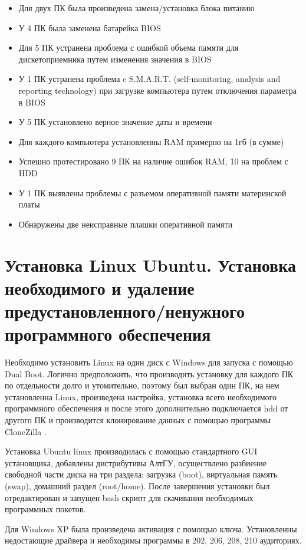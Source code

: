\documentclass[14pt, oneside]{altsu-report}
\begin{document}
\begin{itemize}
  \item Для двух ПК была произведена замена/установка блока питанию
  \item У 4 ПК была заменена батарейка BIOS
  \item Для 5 ПК устранена проблема с ошибкой объема памяти для дискетоприемника путем изменения значения в BIOS
  \item У 1 ПК устранена проблема c S.M.A.R.T. (self-monitoring, analysis and reporting technology) \cite{smart} при загрузке компьютера путем отключения параметра в BIOS
  \item У 5 ПК установлено верное значение даты и времени
  \item Для каждого компьютера установленны RAM примерно на 1гб (в сумме)
  \item Успешно протестировано 9 ПК на наличие ошибок RAM, 10 на проблем с HDD
  \item У 1 ПК выявлены проблемы с разъемом оперативной памяти материнской платы
  \item Обнаружены две неисправные плашки оперативной памяти
\end{itemize}

\section{Установка Linux Ubuntu. Установка необходимого и удаление предустановленного/ненужного программного обеспечения}
Необходимо установить Linux на один диск с Windows для запуска с помощью Dual Boot. Логично предположить, что производить установку для каждого ПК по отдельности долго и утомительно, поэтому был выбран один ПК, на нем установленна Linux, произведена настройка, установка всего необходимого программного обеспечения и после этого дополнительно подключается hdd от другого ПК и производится клонирование данных с помощью программы CloneZilla \cite{clonezilla}. 

Установка Ubuntu linux производилась с помощью стандартного GUI установщика, добавлены дистрибутивы АлтГУ, осуществлено разбиение свободной части диска на три раздела: загрузка (boot), виртуальная память (swap), домашний раздел (root/home). После завершения установки был отредактирован и запущен bash скрипт для скачивания необходимых программных покетов. 

Для Windows XP была произведена активация с помощью ключа. 
Установленны недостающие драйвера и необходимы программы в 202, 206, 208, 210 аудиториях.
\end{document}
